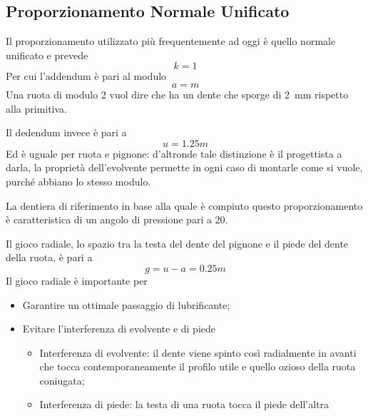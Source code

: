 \documentclass[a4paper, 15pt]{article}
\begin{document}
\subsection{Proporzionamento Normale Unificato}
\begin{adjustwidth}{2in}{}					
		Il proporzionamento utilizzato più frequentemente ad oggi è quello normale unificato e prevede \[k=1\] Per cui l'addendum è pari al modulo \[a=m\] Una ruota di modulo 2 vuol dire che ha un dente che sporge di \SI{2}{\milli\meter} rispetto alla primitiva. \newline 
		
		Il dedendum invece è pari a \[u = 1.25m\] Ed è uguale per ruota e pignone: d'altronde tale distinzione è il progettista a darla, la proprietà dell'evolvente permette in ogni caso di montarle come si vuole, purché abbiano lo stesso modulo. \newline 
		
		La dentiera di riferimento in base alla quale è compiuto questo proporzionamento è caratteristica di un angolo
		di pressione pari a 20\degree. \newline
		
		Il gioco radiale, lo spazio tra la testa del dente del pignone e il piede del dente della ruota, è pari a \[g = u-a = 0.25m\] Il gioco radiale è importante per
		\begin{itemize}
			\item Garantire un ottimale passaggio di lubrificante;
			\item Evitare l'interferenza di evolvente e di piede
			\begin{itemize}
				\item Interferenza di evolvente: il dente viene spinto così radialmente in avanti che tocca contemporaneamente il profilo utile e quello ozioso della ruota coniugata;
				\item Interferenza di piede: la testa di una ruota tocca il piede dell'altra
			\end{itemize}
			
		\end{itemize} 
\end{adjustwidth}
\end{document}

